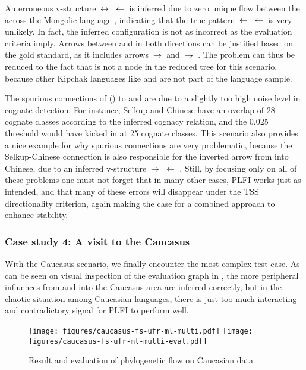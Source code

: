  An erroneous v-structure  $\kern 2pt\hbox{$\leftrightarrow$}\kern 2pt$  $\kern 2pt\hbox{$\leftarrow$}\kern 2pt$  is inferred due to zero unique flow between the  across the Mongolic language , indicating that the true pattern  $\kern 2pt\hbox{$\leftarrow$}\kern 2pt$  $\kern 2pt\hbox{$\leftarrow$}\kern 2pt$  is very unlikely. In fact, the inferred configuration is not as incorrect as the evaluation criteria imply. Arrows between  and  in both directions can be justified based on the gold standard, as it includes arrows  $\kern 2pt\hbox{$\rightarrow$}\kern 2pt$  and  $\kern 2pt\hbox{$\rightarrow$}\kern 2pt$ . The problem can thus be reduced to the fact that  is not a node in the reduced tree for this scenario, because other Kipchak languages like  and  are not part of the language sample.
 
 The spurious connections of  () to  and  are due to a slightly too high noise level in cognate detection. For instance, Selkup and Chinese have an overlap of 28 cognate classes according to the inferred cognacy relation, and the 0.025 threshold would have kicked in at 25 cognate classes. This scenario also provides a nice example for why spurious connections are very problematic, because the Selkup-Chinese connection is also responsible for the inverted arrow from  into Chinese, due to an inferred v-structure  $\kern 2pt\hbox{$\rightarrow$}\kern 2pt$  $\kern 2pt\hbox{$\leftarrow$}\kern 2pt$ . Still, by focusing only on all of these problems one must not forget that in many other cases, PLFI works just as intended, and that many of these errors will disappear under the TSS directionality criterion, again making the case for a combined approach to enhance stability.


\subsubsection{Case study 4: A visit to the Caucasus}
With the Caucasus scenario, we finally encounter the most complex test case. As can be seen on visual inspection of the evaluation graph in , the more peripheral influences from  and  into the Caucasus area are inferred correctly, but in the chaotic situation among Caucasian languages, there is just too much interacting and contradictory signal for PLFI to perform well.
  
  \begin{figure}[ht!]
 \texttt{[image: figures/caucasus-fs-ufr-ml-multi.pdf]}
 \vspace*{5mm}
 \texttt{[image: figures/caucasus-fs-ufr-ml-multi-eval.pdf]}
 \caption{Result and evaluation of phylogenetic flow on Caucasian data}
 \label{caucasus-result-phylo}
 \end{figure}

